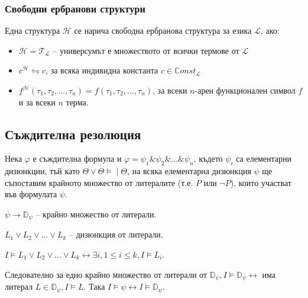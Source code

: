 \documentclass{article}
\newcommand{\mymod}{\models\!\mid}
\begin{document}
\subsubsection*{Свободни ербранови структури}

\begin{mydef}
Една структура $\mathcal{H}$ се нарича свободна ербранова структура за езика $\mathcal{L}$, ако:
\begin{itemize}
\item $\mathcal{H} = \mathcal{T}_\mathcal{L}$ -- универсумът е множеството от всички термове от $\mathcal{L}$
\item $c^\mathcal{H} \leftrightharpoons c$, за всяка индивидна константа $c \in \mathbb{C}onst_\mathcal{L}$
\item $f^\mathcal{H}(\tau_1, \tau_2, \ldots, \tau_n) = f(\tau_1, \tau_2, \ldots, \tau_n)$, за всеки $n$-арен функционален символ $f$ и за всеки $n$ терма.
\end{itemize}
\end{mydef}


\subsection*{Съждителна резолюция}

\begin{mydef}
Нека $\varphi$ е съждителна формула и $\varphi = \psi_1 \& \psi_2\&\ldots\&\psi_n$, където $\psi_i$ са елементарни дизюнкции, тъй като $\Theta \lor \Theta \mymod \Theta$, на всяка елементарна дизюнкция $\psi$ ще съпоставим крайното множество от литералите (т.е. $P$ или $\neg P$), които участват във формулата $\psi$.

$\psi \longrightarrow \mathbb{D}_\psi$ -- крайно множество от литерали.

$L_1 \lor L_2 \lor \ldots \lor L_k $ -- дизюнкция от литерали.

$I \models L_1 \lor L_2 \lor \ldots \lor L_k \longleftrightarrow \exists i, 1 \leq i \leq k, I\models L_i$.

Следователно за едно крайно множество от литерали от $\mathbb{D}_\psi, I \models \mathbb{D}_\psi \longleftrightarrow$ има литерал $L \in \mathbb{D}_\psi, I \models L$. Така $I \models \psi \longleftrightarrow I \models \mathbb{D}_\psi$.

\end{mydef}
\end{document}
